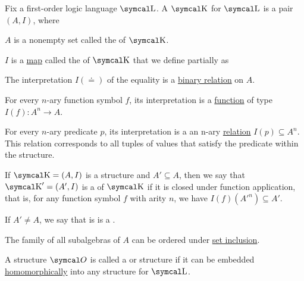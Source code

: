 \begin{definition}\label{def:first_order_structure}
  Fix a first-order logic language \( \CL \). A  \( \CK \) for \( \CL \) is a pair \( (A, I) \), where
  \begin{DefEnum}
     \( A \) is a nonempty set called the  of \( \CK \).

     \( I \) is a \hyperref[def:function]{map} called the  of \( \CK \) that we define partially as
    \begin{DefEnum}
       The interpretation \( I(\doteq) \) of the equality is a \hyperref[def:binary_relation]{binary relation} on \( A \).

       For every \( n \)-ary function symbol \( f \), its interpretation is a \hyperref[def:function]{function} of type \( I(f): A^n \to A \).

       For every \( n \)-ary predicate \( p \), its interpretation is a an n-ary \hyperref[def:relation]{relation} \( I(p) \subseteq A^n \). This relation corresponds to all tuples of values that satisfy the predicate within the structure.
    \end{DefEnum}
  \end{DefEnum}
\end{definition}

\begin{definition}\label{def:first_order_substructure}
  If \( \CK = (A, I) \) is a structure and \( A' \subseteq A \), then we say that \( \CK' = (A', I) \) is a  of \( \CK \) if it is closed under function application, that is, for any function symbol \( f \) with arity \( n \), we have \( I(f)(A'^n) \subseteq A' \).

  If \( A' \neq A \), we say that is is a .

  The family of all subalgebras of \( A \) can be ordered under \hyperref[def:subset]{set inclusion}.

  A structure \( \Cal{O} \) is called a  or  structure if it can be embedded \hyperref[def:first_order_homomorphism/embedding]{homomorphically} into any structure for \( \CL \).
\end{definition}

